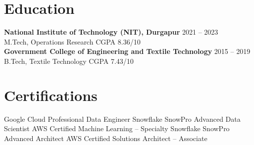 \documentclass[10pt,a4paper]{article}
\begin{document}
\section*{Education}
\textbf{National Institute of Technology (NIT), Durgapur} \hfill 2021 -- 2023\\
M.Tech, Operations Research \textbar{} CGPA 8.36/10\\[2pt]
\textbf{Government College of Engineering and Textile Technology} \hfill 2015 -- 2019\\
B.Tech, Textile Technology \textbar{} CGPA 7.43/10

\section*{Certifications}
Google Cloud Professional Data Engineer \textbar{} Snowflake SnowPro Advanced Data Scientist \textbar{} AWS Certified Machine Learning -- Specialty \textbar{} Snowflake SnowPro Advanced Architect \textbar{} AWS Certified Solutions Architect -- Associate
\end{document}
